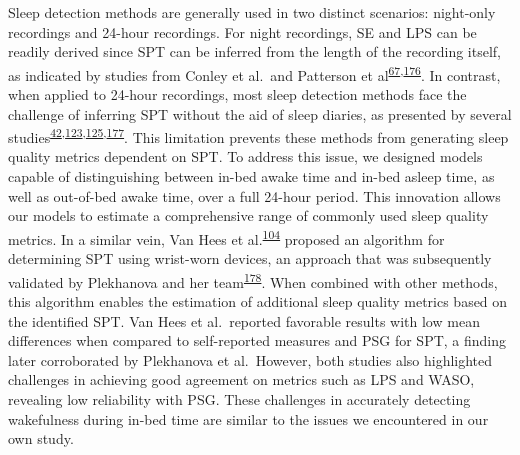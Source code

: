 \documentclass[
  10pt,
]{scrbook}
\begin{document}
Sleep detection methods are generally used in two distinct scenarios:
night-only recordings and 24-hour recordings. For night recordings, SE
and LPS can be readily derived since SPT can be inferred from the length
of the recording itself, as indicated by studies from Conley et al.~and
Patterson et
al\textsuperscript{\protect\hyperlink{ref-conley_agreement_2019}{67},\protect\hyperlink{ref-patterson_40_2023}{176}}.
In contrast, when applied to 24-hour recordings, most sleep detection
methods face the challenge of inferring SPT without the aid of sleep
diaries, as presented by several
studies\textsuperscript{\protect\hyperlink{ref-girschik_validation_2012}{42},\protect\hyperlink{ref-doherty_large_2017}{123},\protect\hyperlink{ref-anderson_assessment_2014}{125},\protect\hyperlink{ref-dozydave2023snooze}{177}}.
This limitation prevents these methods from generating sleep quality
metrics dependent on SPT. To address this issue, we designed models
capable of distinguishing between in-bed awake time and in-bed asleep
time, as well as out-of-bed awake time, over a full 24-hour period. This
innovation allows our models to estimate a comprehensive range of
commonly used sleep quality metrics. In a similar vein, Van Hees et
al.\textsuperscript{\protect\hyperlink{ref-van_hees_estimating_2018}{104}}
proposed an algorithm for determining SPT using wrist-worn devices, an
approach that was subsequently validated by Plekhanova and her
team\textsuperscript{\protect\hyperlink{ref-plekhanova_validation_2023}{178}}.
When combined with other methods, this algorithm enables the estimation
of additional sleep quality metrics based on the identified SPT. Van
Hees et al.~reported favorable results with low mean differences when
compared to self-reported measures and PSG for SPT, a finding later
corroborated by Plekhanova et al.~However, both studies also highlighted
challenges in achieving good agreement on metrics such as LPS and WASO,
revealing low reliability with PSG. These challenges in accurately
detecting wakefulness during in-bed time are similar to the issues we
encountered in our own study.
\end{document}
